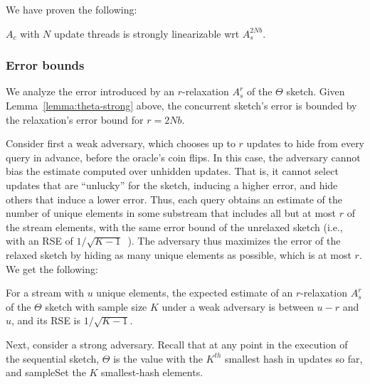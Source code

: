 We have proven the following:

\begin{lemma}%
$A_c$  with $N$ update threads is strongly linearizable wrt $A^{2Nb}_s$.
\label{lemma:theta-strong}
\end{lemma}

\subsubsection{Error bounds}

We analyze the error introduced by an $r$-relaxation $A^r_s$ of the $\Theta$ sketch.
Given Lemma~\ref{lemma:theta-strong} above, the concurrent sketch's error is bounded
by the relaxation's error bound for $r=2Nb$.  

Consider first a weak adversary, which chooses up to $r$ updates to hide from every query in advance,
before the oracle's coin flips. In this case, the adversary cannot bias the estimate computed
over unhidden updates. That is, it cannot select updates that are ``unlucky'' for the sketch, inducing 
a higher error, and hide others that induce a lower error. 
Thus, each query obtains an estimate of the number of unique elements
in some substream that includes all but at most $r$ of the stream elements, with the same error bound of the 
unrelaxed sketch (i.e., with an RSE of $1/\sqrt{K-1}$~\cite{KMV}). 
The adversary thus maximizes the error of the relaxed sketch by hiding as many unique elements as possible,
which is at most $r$. 
We get the following:
\begin{claim}
For a stream with $u$ unique elements, the expected estimate of an $r$-relaxation $A^r_s$ of the $\Theta$ sketch
with sample size $K$ under a weak adversary is between $u-r$ and $u$, and its  RSE is $1/\sqrt{K-1}$. 
\end{claim}

Next, consider a strong adversary. 
Recall that at any point in the execution of the sequential sketch, $\Theta$ is the value with the $K^{th}$ smallest 
hash in updates so far, and sampleSet the $K$ smallest-hash elements.  

